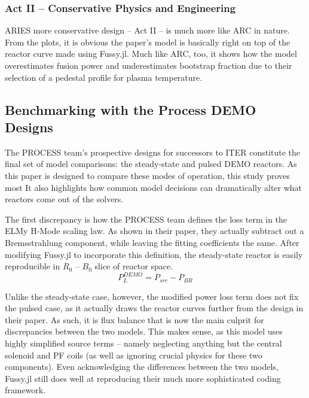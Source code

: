 \subsubsection{Act II -- Conservative Physics and Engineering}

ARIES more conservative design -- Act II -- is much more like ARC in nature. From the plots, it is obvious the paper's model is basically right on top of the reactor curve made using Fussy.jl.  Much like ARC, too, it shows how the model overestimates fusion power and underestimates bootstrap fraction due to their selection of a pedestal profile for plasma temperature.

\subsection{Benchmarking with the Process DEMO Designs}

The PROCESS team's prospective designs for successors to ITER constitute the final set of model comparisons: the steady-state and pulsed DEMO reactors. As this paper is designed to compare these modes of operation, this study proves most  It also highlights how common model decisions can dramatically alter what reactors come out of the solvers.

The first discrepancy is how the PROCESS team defines the loss term in the ELMy H-Mode scaling law. As shown in their paper, they actually subtract out a Bremsstrahlung component, while leaving the fitting coefficients the same. \cite{process} After modifying Fussy.jl to incorporate this definition, the steady-state reactor is easily reproducible in $R_0$ -- $B_0$ slice of reactor space.
\begin{equation}
	\label{eq:pl_demo}
	P_L^{DEMO} = P_{src} - P_{BR}
\end{equation}

Unlike the steady-state case, however, the modified power loss term does not fix the pulsed case, as it actually draws the reactor curves further from the design in their paper. As such, it is flux balance that is now the main culprit for discrepancies between the two models. This makes sense, as this model uses highly simplified source terms -- namely neglecting anything but the central solenoid and PF coils (as well as ignoring crucial physics for these two components). Even acknowledging the differences between the two models, Fussy.jl still does  well at reproducing their much more sophisticated coding framework. 

